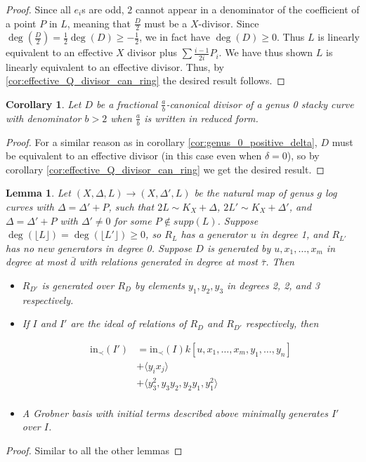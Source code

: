 \documentclass{amsart}
\theoremstyle{plain}
\newtheorem{lem}[thm]{Lemma}
\newtheorem{cor}[thm]{Corollary}
\theoremstyle{definition}
\theoremstyle{remark}
\numberwithin{equation}{section}
\newcommand \subhalf[1]{\frac{{#1} - 1}{2{#1}}}
\newcommand \halfcan{L}
\newcommand \initial{\text{in}}
\begin{document}
{\begin{proof}
Since all $e_i$s are odd, $2$ cannot appear in a denominator of the 
coefficient of a point $P$ in $\halfcan$, meaning that $\frac{D}{2}$
 must be a $X$-divisor.  Since $\deg(\frac{D}{2})=\frac{1}{2}\deg(D)
\ge -\frac{1}{2}$, we in fact have $\deg(D)\ge 0$.  Thus $\halfcan$ 
is linearly equivalent to an effective $X$ divisor plus $\sum 
\subhalf{i}P_i$.  We have thus shown $\halfcan$ is linearly equivalent to an effective divisor.  Thus, by \ref{cor:effective_Q_divisor_can_ring} the desired result follows.
\end{proof}

\begin{cor}
Let $D$ be a fractional $\frac{a}{b}$-canonical divisor of a genus 0 stacky curve with denominator $b > 2$ when $\frac{a}{b}$ is written in reduced form.
\end{cor}
\begin{proof}
For a similar reason as in corollary \ref{cor:genus_0_positive_delta}, $D$ must be equivalent to an effective divisor (in this case even when $\delta=0$), so by corollary \ref{cor:effective_Q_divisor_can_ring} we get the desired result.
\end{proof}

\begin{lem}\label{lem:add_point_effective_divisor_no_deg_1_generators}
Let $(X,\Delta,\halfcan)\to (X,\Delta',\halfcan)$ be the natural map of genus $g$ log curves with $\Delta=\Delta'+P$, such that $2\halfcan\sim K_X+\Delta$, $2\halfcan'\sim K_X+\Delta'$, and $\Delta=\Delta'+P$ with $\Delta'\ne 0$ for some $P\not\in supp(\halfcan)$.  
Suppose $\deg(\lfloor{\halfcan}\rfloor)=\deg(\lfloor \halfcan'\rfloor)\ge 0$, so $R_{\halfcan}$ has a
generator $u$ in degree 1, and $R_{\halfcan'}$ has no new generators in degree 0.  Suppose $D$ is generated by $u, x_1, \ldots, x_m$ in degree at most $\bar{d}$ with relations generated 
in degree at most $\bar{\tau}$.
Then 
\begin{itemize}
\item $R_{D'}$ is generated over $R_D$ by elements $y_1, y_2, y_3$ in degrees 2, 2, and 3 respectively.  
\item If $I$ and $I'$ are the ideal of relations of $R_D$ and $R_{D'}$ respectively, then 

\begin{align*}
	\initial_\prec(I') &= \initial_\prec(I) k[u, x_1, \ldots, x_m, y_1, \ldots, y_n] \\
										 &+ \langle y_i x_j \rangle \\
										 &+ \langle y_3^2, y_3y_2, y_2y_1, y_1^2\rangle \\
\end{align*}
\item A Grobner basis with initial terms described above minimally generates $I'$ over $I$.
\end{itemize}
\end{lem}
\begin{proof}
Similar to all the other lemmas
\end{proof}



}
\fi
\end{document}
